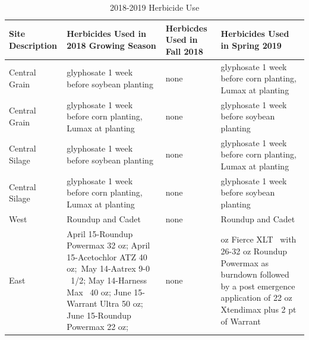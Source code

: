 \documentclass[]{article}
\begin{document}
\begin{table}[H]

\caption{\label{tab:unnamed-chunk-2}2018-2019 Herbicide Use}
\centering
\begin{tabular}[t]{>{\centering\arraybackslash}p{5em}>{\centering\arraybackslash}p{10em}>{\centering\arraybackslash}p{5em}>{\centering\arraybackslash}p{10em}}
\toprule
Site Description & Herbicides Used in 2018 Growing Season & Herbicdes Used in Fall 2018 & Herbicides Used in Spring 2019\\
\midrule
\rowcolor{gray!6}  Central Grain & glyphosate 1 week before soybean planting & none & glyphosate 1 week before corn planting, Lumax at planting\\
Central Grain & glyphosate 1 week before corn planting, Lumax at planting & none & glyphosate 1 week before soybean planting\\
\rowcolor{gray!6}  Central Silage & glyphosate 1 week before soybean planting & none & glyphosate 1 week before corn planting, Lumax at planting\\
Central Silage & glyphosate 1 week before corn planting, Lumax at planting & none & glyphosate 1 week before soybean planting\\
\rowcolor{gray!6}  West & Roundup and Cadet & none & Roundup and Cadet\\
\addlinespace
East & April 15-Roundup Powermax 32 oz; April 15-Acetochlor ATZ 40 oz; May 14-Aatrex 9-0   1/2; May 14-Harness Max  40 oz; June 15-Warrant Ultra 50 oz; June 15-Roundup Powermax 22 oz; & none & 3 oz Fierce XLT  with 26-32 oz Roundup Powermax as burndown followed by a post emergence application of 22 oz Xtendimax plus 2 pt of Warrant\\
\bottomrule
\end{tabular}
\end{table}

\newpage
\end{document}
